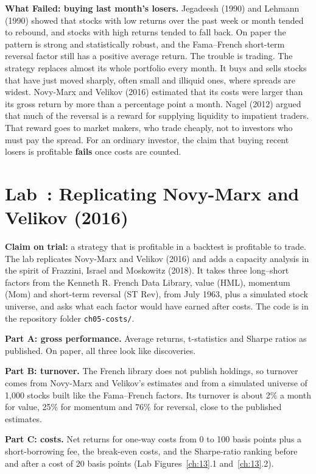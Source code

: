 \begin{callout}
\textbf{What Failed: buying last month's losers.} Jegadeesh (1990) and Lehmann (1990) showed that stocks with low returns over the past week or month tended to rebound, and stocks with high returns tended to fall back. On paper the pattern is strong and statistically robust, and the Fama--French short-term reversal factor still has a positive average return. The trouble is trading. The strategy replaces almost its whole portfolio every month. It buys and sells stocks that have just moved sharply, often small and illiquid ones, where spreads are widest. Novy-Marx and Velikov (2016) estimated that its costs were larger than its gross return by more than a percentage point a month. Nagel (2012) argued that much of the reversal is a reward for supplying liquidity to impatient traders. That reward goes to market makers, who trade cheaply, not to investors who must pay the spread. For an ordinary investor, the claim that buying recent losers is profitable \textbf{fails} once costs are counted.
\end{callout}

\section{Lab~\thechapter: Replicating Novy-Marx and Velikov (2016)}
\label{sec:17-lab}

\textbf{Claim on trial:} a strategy that is profitable in a backtest is profitable to trade. The lab replicates Novy-Marx and Velikov (2016) and adds a capacity analysis in the spirit of Frazzini, Israel and Moskowitz (2018). It takes three long--short factors from the Kenneth R. French Data Library, value (HML), momentum (Mom) and short-term reversal (ST Rev), from July 1963, plus a simulated stock universe, and asks what each factor would have earned after costs. The code is in the repository folder \texttt{ch05-costs/}.

\textbf{Part A: gross performance.} Average returns, t-statistics and Sharpe ratios as published. On paper, all three look like discoveries.

\textbf{Part B: turnover.} The French library does not publish holdings, so turnover comes from Novy-Marx and Velikov's estimates and from a simulated universe of 1,000 stocks built like the Fama--French factors. Its turnover is about 2\% a month for value, 25\% for momentum and 76\% for reversal, close to the published estimates.

\textbf{Part C: costs.} Net returns for one-way costs from 0 to 100 basis points plus a short-borrowing fee, the break-even costs, and the Sharpe-ratio ranking before and after a cost of 20 basis points (Lab Figures~\ref{ch:13}.1 and~\ref{ch:13}.2).

